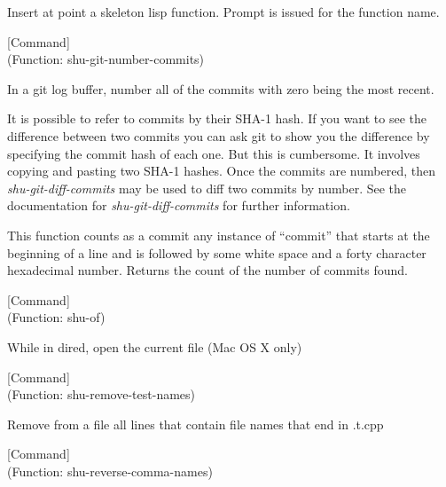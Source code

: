 \begin{doc-string}
Insert at point a skeleton lisp function.  Prompt is issued for the function
name.
\end{doc-string}

\vspace{1em}
\noindent
{}
\usebox{\funcname}
 \hfill [Command]\\%
 (Function: shu-git-number-commits)

\begin{doc-string}
In a git log buffer, number all of the commits with zero being the most
recent.

It is possible to refer to commits by their SHA-1 hash.  If you want to see the
difference between two commits you can ask git to show you the difference by
specifying the commit hash of each one.  But this is cumbersome.  It involves
copying and pasting two SHA-1 hashes.  Once the commits are numbered, then
\emph{shu-git-diff-commits} may be used to diff two commits by number.  See the
documentation for \emph{shu-git-diff-commits} for further information.

This function counts as a commit any instance of ``commit'' that starts at the
beginning of a line and is followed by some white space and a forty character
hexadecimal number.  Returns the count of the number of commits found.
\end{doc-string}

\vspace{1em}
\noindent
{}
\usebox{\funcname}
 \hfill [Command]\\%
 (Function: shu-of)

\begin{doc-string}
While in dired, open the current file (Mac OS X only)
\end{doc-string}

\vspace{1em}
\noindent
{}
\usebox{\funcname}
 \hfill [Command]\\%
 (Function: shu-remove-test-names)

\begin{doc-string}
Remove from a file all lines that contain file names that end in .t.cpp
\end{doc-string}

\vspace{1em}
\noindent
{}
\usebox{\funcname}
 \hfill [Command]\\%
 (Function: shu-reverse-comma-names)

